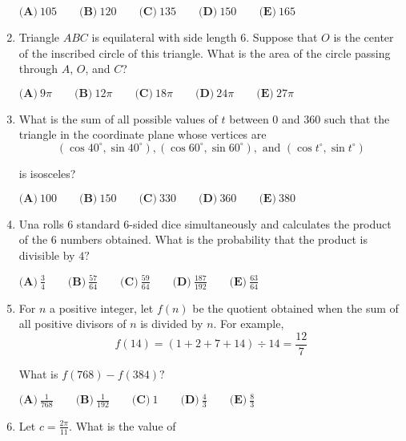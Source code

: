 \documentclass{article}
\begin{document}
\begin{enumerate}[label=\arabic*., itemsep=0.5em]
\(\textbf{(A)} \: 105 \qquad\textbf{(B)} \: 120 \qquad\textbf{(C)} \: 135 \qquad\textbf{(D)} \: 150 \qquad\textbf{(E)} \: 165\)\par \vspace{0.5em}\item Triangle \(ABC\) is equilateral with side length \(6\). Suppose that \(O\) is the center of the inscribed
circle of this triangle. What is the area of the circle passing through \(A\), \(O\), and \(C\)?

\(\textbf{(A)} \: 9\pi \qquad\textbf{(B)} \: 12\pi \qquad\textbf{(C)} \: 18\pi \qquad\textbf{(D)} \: 24\pi \qquad\textbf{(E)} \: 27\pi\)\par \vspace{0.5em}\item What is the sum of all possible values of \(t\) between \(0\) and \(360\) such that the triangle in the coordinate plane whose vertices are 
\begin{equation*}
(\cos 40^\circ,\sin 40^\circ), (\cos 60^\circ,\sin 60^\circ), \text{ and } (\cos t^\circ,\sin t^\circ)
\end{equation*}

is isosceles? 

\(\textbf{(A)} \: 100 \qquad\textbf{(B)} \: 150 \qquad\textbf{(C)} \: 330 \qquad\textbf{(D)} \: 360 \qquad\textbf{(E)} \: 380\)\par \vspace{0.5em}\item Una rolls \(6\) standard \(6\)-sided dice simultaneously and calculates the product of the \(6{ }\) numbers obtained. What is the probability that the product is divisible by \(4?\)

\(\textbf{(A)}\: \frac34\qquad\textbf{(B)} \: \frac{57}{64}\qquad\textbf{(C)} \: \frac{59}{64}\qquad\textbf{(D)} \: \frac{187}{192}\qquad\textbf{(E)} \: \frac{63}{64}\)\par \vspace{0.5em}\item For \(n\) a positive integer, let \(f(n)\) be the quotient obtained when the sum of all positive divisors of \(n\) is divided by \(n.\) For example, 
\begin{equation*}
f(14)=(1+2+7+14)\div 14=\frac{12}{7}
\end{equation*}

What is \(f(768)-f(384)?\)

\(\textbf{(A)}\ \frac{1}{768} \qquad\textbf{(B)}\ \frac{1}{192} \qquad\textbf{(C)}\ 1 \qquad\textbf{(D)}\
\frac{4}{3} \qquad\textbf{(E)}\ \frac{8}{3}\)\par \vspace{0.5em}\item Let \(c = \frac{2\pi}{11}.\) What is the value of


\end{enumerate}
\end{document}
